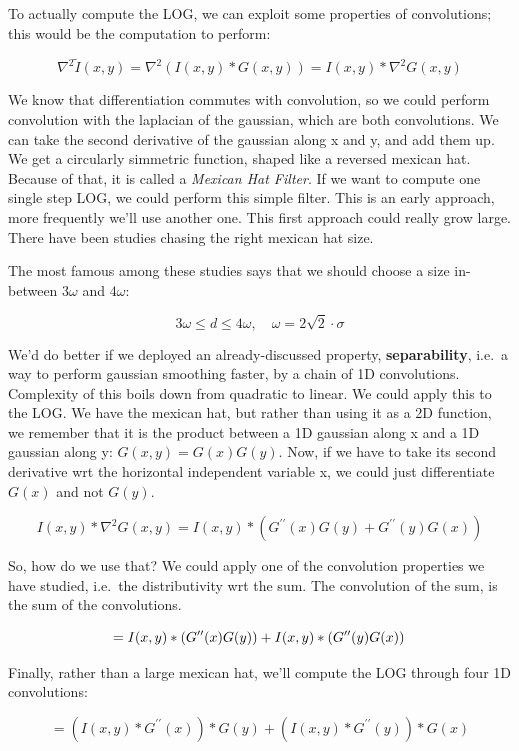 \documentclass{article}
\begin{document}
To actually compute the LOG, we can exploit some properties of
convolutions; this would be the computation to perform:

\[
\nabla^{2} \tilde{I}(x, y)=\nabla^{2}(I(x, y) * G(x, y))=I(x, y) * \nabla^{2} G(x, y)
\]

We know that differentiation commutes with convolution, so we could
perform convolution with the laplacian of the gaussian, which are both
convolutions. We can take the second derivative of the gaussian along x
and y, and add them up. We get a circularly simmetric function, shaped
like a reversed mexican hat. Because of that, it is called a
\emph{Mexican Hat Filter}. If we want to compute one single step LOG, we
could perform this simple filter. This is an early approach, more
frequently we'll use another one. This first approach could really grow
large. There have been studies chasing the right mexican hat size.

The most famous among these studies says that we should choose a size
in-between \(3\omega\) and \(4\omega\):

\[
3 \omega \leq d \leq 4 \omega, \quad \omega=2 \sqrt{2} \cdot \sigma
\]

We'd do better if we deployed an already-discussed property,
\textbf{separability}, i.e.~a way to perform gaussian smoothing faster,
by a chain of 1D convolutions. Complexity of this boils down from
quadratic to linear. We could apply this to the LOG. We have the mexican
hat, but rather than using it as a 2D function, we remember that it is
the product between a 1D gaussian along x and a 1D gaussian along y:
\(G(x,y) = G(x)G(y)\). Now, if we have to take its second derivative wrt
the horizontal independent variable x, we could just differentiate
\(G(x)\) and not \(G(y)\).

\[
I(x, y) * \nabla^{2} G(x, y)=I(x, y) *\left(G^{\prime \prime}(x) G(y)+G^{\prime \prime}(y) G(x)\right)
\]

So, how do we use that? We could apply one of the convolution properties
we have studied, i.e.~the distributivity wrt the sum. The convolution of
the sum, is the sum of the convolutions.

\[
=I(x, y) *\left(G^{\prime \prime}(x) G(y)\right)+I(x, y) *\left(G^{\prime \prime}(y) G(x)\right) \\
\]

Finally, rather than a large mexican hat, we'll compute the LOG through
four 1D convolutions:

\[
=\left(I(x, y) * G^{\prime \prime}(x)\right) * G(y)+\left(I(x, y) * G^{\prime \prime}(y)\right) * G(x)
\]
\end{document}

